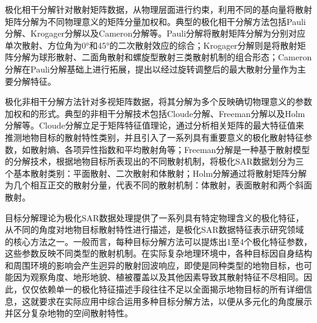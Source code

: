 极化相干分解针对散射矩阵数据，从物理层面进行约束，利用不同的基向量将散射矩阵分解为不同物理意义的矩阵分量加权和。典型的极化相干分解方法包括Pauli分解、Krogager分解以及Cameron分解等。Pauli分解将散射矩阵分解为分别对应单次散射、方位角为0°和45°的二次散射效应的综合；Krogager分解则是将散射矩阵分解为球形散射、二面角散射和螺旋型散射三类散射机制的组合形态；Cameron分解在Pauli分解基础上进行拓展，提出以经过旋转调整后的最大散射分量作为主要分解特征。


极化非相干分解方法针对多视矩阵数据，将其分解为多个反映确切物理意义的参数加权和的形式。典型的非相干分解技术包括Cloude分解、Freeman分解以及Holm分解等。Cloude分解立足于矩阵特征值理论，通过分析相关矩阵的最大特征值来推测地物目标的散射特性类别，并且引入了一系列具有重要意义的极化散射特征参数，如散射熵、各项异性指数和平均散射角等；Freeman分解是一种基于散射模型的分解技术，根据地物目标所表现出的不同散射机制，将极化SAR数据划分为三个基本散射类别：平面散射、二次散射和体散射；Holm分解通过将散射矩阵分解为几个相互正交的散射分量，代表不同的散射机制：体散射，表面散射和两个斜面散射。

目标分解理论为极化SAR数据处理提供了一系列具有特定物理含义的极化特征，从不同的角度对地物目标散射特性进行描述，是极化SAR数据特征表示研究领域的核心方法之一。一般而言，每种目标分解方法可以提炼出1至4个极化特征参数，这些参数反映不同类型的散射机制。在实际复杂地理环境中，各种目标因自身结构和周围环境的影响会产生迥异的散射回波响应，即使是同种类型的地物目标，也可能因为观察角度、地形地貌、植被覆盖以及其他因素导致其散射特征不尽相同。因此，仅仅依赖单一的极化特征描述手段往往不足以全面揭示地物目标的所有详细信息，这就要求在实际应用中综合运用多种目标分解方法，以便从多元化的角度展示并区分复杂地物的空间散射特性。



